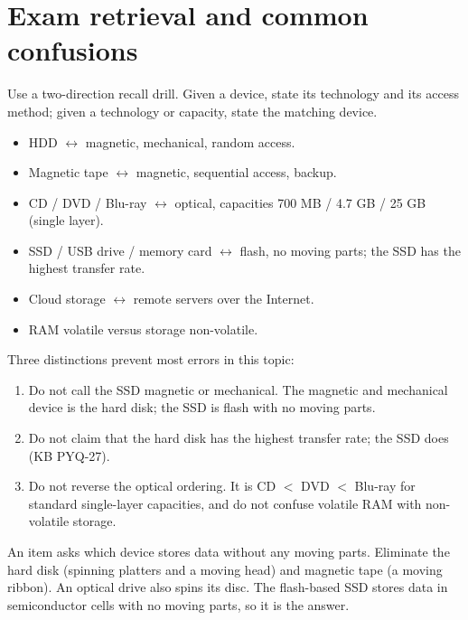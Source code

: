 \section{Exam retrieval and common confusions}
Use a two-direction recall drill. Given a device, state its technology and its
access method; given a technology or capacity, state the matching device.
\begin{itemize}
  \item HDD $\leftrightarrow$ magnetic, mechanical, random access.
  \item Magnetic tape $\leftrightarrow$ magnetic, sequential access, backup.
  \item CD / DVD / Blu-ray $\leftrightarrow$ optical, capacities 700 MB /
    4.7 GB / 25 GB (single layer).
  \item SSD / USB drive / memory card $\leftrightarrow$ flash, no moving
    parts; the SSD has the highest transfer rate.
  \item Cloud storage $\leftrightarrow$ remote servers over the Internet.
  \item RAM volatile versus storage non-volatile.
\end{itemize}

Three distinctions prevent most errors in this topic:
\begin{enumerate}
  \item Do not call the SSD magnetic or mechanical. The magnetic and
    mechanical device is the hard disk; the SSD is flash with no moving parts.
  \item Do not claim that the hard disk has the highest transfer rate; the
    SSD does (KB PYQ-27).
  \item Do not reverse the optical ordering. It is CD $<$ DVD $<$ Blu-ray
    for standard single-layer capacities, and do not confuse volatile RAM
    with non-volatile storage.
\end{enumerate}

\begin{example}
An item asks which device stores data without any moving parts. Eliminate the
hard disk (spinning platters and a moving head) and magnetic tape (a moving
ribbon). An optical drive also spins its disc. The flash-based SSD stores data
in semiconductor cells with no moving parts, so it is the answer.
\end{example}

